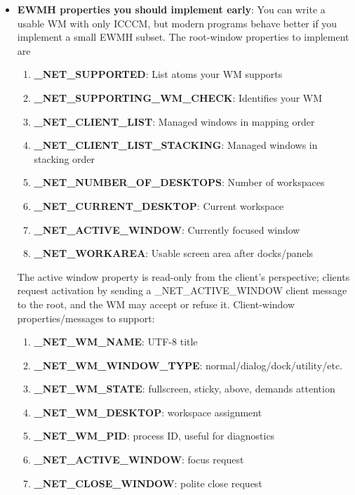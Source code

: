 \documentclass{report}
\begin{document}
\begin{itemize}
        \item \textbf{EWMH properties you should implement early}: You can write a usable WM with only ICCCM, but modern programs behave better if you implement a small EWMH subset.
            \bigbreak \noindent 
            The root-window properties to implement are
            \begin{enumerate}
                \item \textbf{\_NET\_SUPPORTED}:	List atoms your WM supports
                \item \textbf{\_NET\_SUPPORTING\_WM\_CHECK}:	Identifies your WM
                \item \textbf{\_NET\_CLIENT\_LIST}:	Managed windows in mapping order
                \item \textbf{\_NET\_CLIENT\_LIST\_STACKING}:	Managed windows in stacking order
                \item \textbf{\_NET\_NUMBER\_OF\_DESKTOPS}:	Number of workspaces
                \item \textbf{\_NET\_CURRENT\_DESKTOP}:	Current workspace
                \item \textbf{\_NET\_ACTIVE\_WINDOW}:	Currently focused window
                \item \textbf{\_NET\_WORKAREA}:	Usable screen area after docks/panels
            \end{enumerate}
            The active window property is read-only from the client’s perspective; clients request activation by sending a \_NET\_ACTIVE\_WINDOW client message to the root, and the WM may accept or refuse it.
            \bigbreak \noindent 
            Client-window properties/messages to support:
            \begin{enumerate}
                \item \textbf{\_NET\_WM\_NAME}:	UTF-8 title
                \item \textbf{\_NET\_WM\_WINDOW\_TYPE}:	normal/dialog/dock/utility/etc.
                \item \textbf{\_NET\_WM\_STATE}:	fullscreen, sticky, above, demands attention
                \item \textbf{\_NET\_WM\_DESKTOP}:	workspace assignment
                \item \textbf{\_NET\_WM\_PID}:	process ID, useful for diagnostics
                \item \textbf{\_NET\_ACTIVE\_WINDOW}:	focus request
                \item \textbf{\_NET\_CLOSE\_WINDOW}:	polite close request

\end{enumerate}
\end{itemize}
\end{document}
